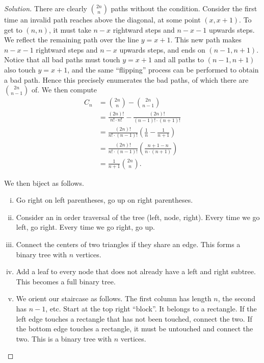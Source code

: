 \ifsolutions
\begin{proof}[Solution]
There are clearly $\binom{2n}{n}$ paths without the condition. Consider the
first time an invalid path reaches above the diagonal, at some point $(x, x +
1)$. To get to $(n, n)$, it must take $n - x$ rightward steps and $n - x - 1$
upwards steps. We reflect the remaining path over the line $y = x + 1$. This new
path makes $n - x - 1$ rightward steps and $n - x$ upwards steps, and ends on
$(n - 1, n + 1)$. Notice that all bad paths must touch $y = x + 1$ and all paths
to $(n - 1, n + 1)$ also touch $y = x + 1$, and the same ``flipping'' process
can be performed to obtain a bad path. Hence this precisely enumerates the bad
paths, of which there are $\binom{2n}{n - 1}$ of. We then compute
\[ \begin{aligned}
C_n &= \binom{2n}{n} - \binom{2n}{n - 1} \\
&= \frac{(2n)!}{n! \cdot n!} - \frac{(2n)!}{(n - 1)! \cdot (n + 1)!} \\
&= \frac{(2n)!}{n! \cdot (n - 1)!} \left( \frac{1}{n} - \frac{1}{n + 1} \right)
\\
&= \frac{(2n)!}{n! \cdot (n - 1)!} \left( \frac{n + 1 - n}{n \cdot (n + 1)}
\right) \\
&= \frac{1}{n + 1} \binom{2n}{n}.
\end{aligned} \]

We then biject as follows.
\begin{enumerate}[(i)]
\item
Go right on left parentheses, go up on right parentheses.
\item
Consider an in order traversal of the tree (left, node, right). Every time we go
left, go right. Every time we go right, go up.
\item
Connect the centers of two triangles if they share an edge. This forms a binary
tree with $n$ vertices.
\item
Add a leaf to every node that does not already have a left and right subtree.
This becomes a full binary tree.
\item
We orient our staircase as follows. The first column has length $n$, the second
has $n - 1$, etc. Start at the top right ``block''. It belongs to a rectangle.
If the left edge touches a rectangle that has not been touched, connect the two.
If the bottom edge touches a rectangle, it must be untouched and connect the
two. This is a binary tree with $n$ vertices.
\end{enumerate}
\end{proof}
\fi

